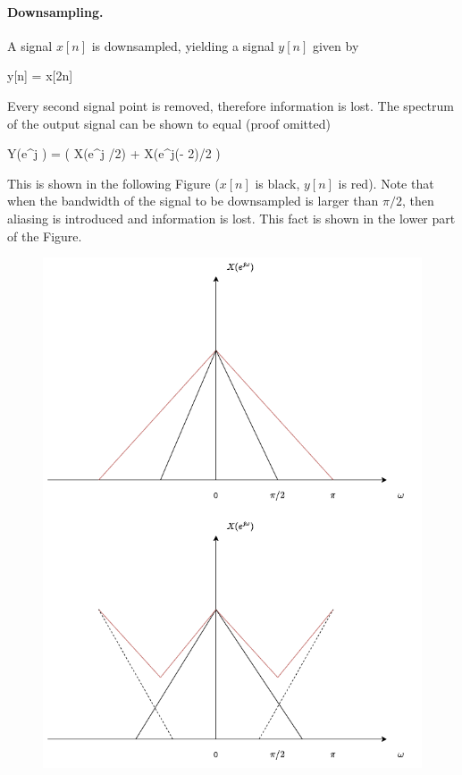 \paragraph{Downsampling.} A signal $x[n]$ is downsampled, yielding a signal $y[n]$ given by

\bee
y[n] = x[2n]
\eee

Every second signal point is removed, therefore information is lost. The spectrum of the output signal can be shown to equal (proof omitted)

\bee
Y(e^{j \omega}) =  \left( X(e^{j \omega/2}) + X(e^{j(\omega - 2\pi)/2} \right)
\eee

This is shown in the following Figure ($x[n]$ is black, $y[n]$ is red). Note that when the bandwidth of the signal to be downsampled is larger than $\pi/2$, then aliasing is introduced and information is lost. This fact is shown in the lower part of the Figure.

\begin{figure}[H]
    \centering
    \includegraphics[scale=0.5]{images/2021-11-09-subband_06.png}
\end{figure}


